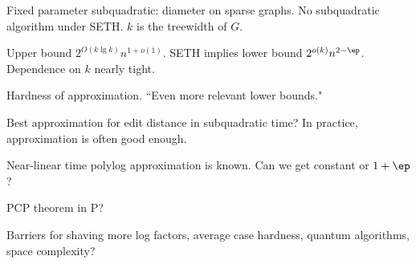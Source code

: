 Fixed parameter subquadratic: diameter on sparse graphs. No subquadratic algorithm under SETH. $k$ is the treewidth of $G$.

Upper bound $2^{O(k\lg k)}n^{1+o(1)}$. SETH implies lower bound $2^{o(k)}n^{2-\ep}$.
Dependence on $k$ nearly tight.

Hardness of approximation. ``Even more relevant lower bounds." 

Best approximation for edit distance in subquadratic time? In practice, approximation is often good enough. 

Near-linear time polylog approximation is known. Can we get constant or $1+\ep$?

PCP theorem in P?

Barriers for shaving more log factors, average case hardness, quantum algorithms, space complexity?


